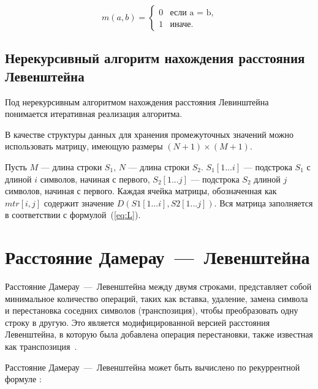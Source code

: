 \begin{equation}
	\label{eq:m}
	m(a, b) = \begin{cases}
		0 &\text{если a = b,}\\
		1 &\text{иначе.}
	\end{cases}
\end{equation}

\subsection{Нерекурсивный алгоритм нахождения расстояния Левенштейна}

Под нерекурсивным алгоритмом нахождения расстояния Левинштейна понимается итеративная реализация алгоритма.

В качестве структуры данных для хранения промежуточных значений можно использовать матрицу, имеющую размеры $(N + 1) \times (M + 1)$.

Пусть $M$ --- длина строки $S_{1}$, $N$ --- длина строки $S_{2}$. 
$S_{1}[1...i]$ --- подстрока $S_{1}$ с длиной $i$ символов, начиная с первого, $S_{2}[1...j]$ --- подстрока $S_{2}$ длиной $j$ символов, начиная с первого. 
Каждая ячейка матрицы, обозначенная как $mtr[i, j]$ содержит значение $D(S1[1...i], S2[1...j])$. Вся матрица заполняется в соответствии с формулой~(\ref{eq:L}). 

\section{Расстояние Дамерау~---~Левенштейна}
Расстояние Дамерау~---~Левенштейна между двумя строками, представляет собой минимальное количество операций, таких как вставка, удаление, замена символа и перестановка соседних символов (транспозиция), чтобы преобразовать одну строку в другую.
Это является модифицированной версией расстояния Левенштейна, в которую была добавлена операция перестановки, также известная как транспозиция~\cite{analysis-lev-damlev}.

Расстояние Дамерау~---~Левенштейна может быть вычислено по рекуррентной формуле \cite{levenshtein}:

